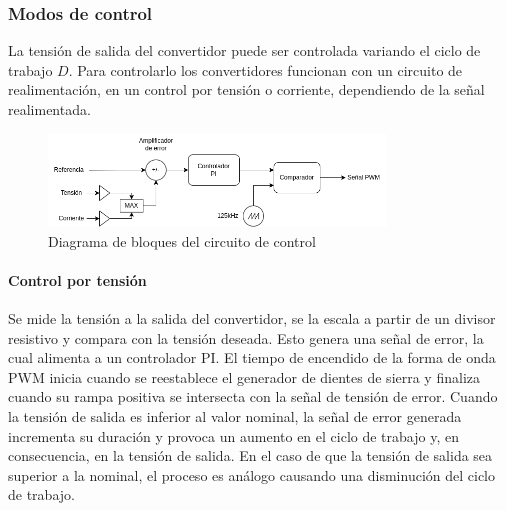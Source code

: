 
\subsubsection{Modos de control}

La tensión de salida del convertidor puede ser controlada variando el ciclo de trabajo $D$. 
Para controlarlo los convertidores funcionan con un circuito de realimentación,
en un control por tensión o corriente, dependiendo de la señal realimentada. 

\begin{figure}[ht]
    \centering
    \includegraphics[width=0.8\textwidth]{images/compensador.png}
    \caption{Diagrama de bloques del circuito de control}
    \label{fig:marco_teorico:control}
\end{figure}

\paragraph{Control por tensión}

Se mide la tensión a la salida del convertidor, se la escala a partir de un divisor resistivo y compara con la tensión deseada.
Esto genera una señal de error, la cual alimenta a un controlador PI.
El tiempo de encendido de la forma de onda PWM inicia cuando se reestablece el generador de dientes de sierra y finaliza cuando su rampa positiva se intersecta con la señal de tensión de error. 
Cuando la tensión de salida es inferior al valor nominal, la señal de error generada incrementa su duración y provoca un aumento en el ciclo de trabajo y, en consecuencia, en la tensión de salida. En el caso de que la tensión de salida sea superior a la nominal, el proceso es análogo causando una disminución del ciclo de trabajo. 

